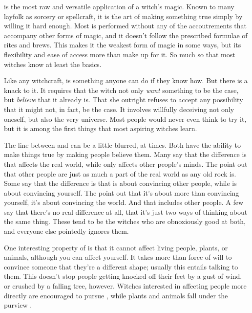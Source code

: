 
 is the most raw and versatile application of a witch's magic.
Known to many layfolk as sorcery or spellcraft, it is the art of making something true simply by willing it hard enough.
Most  is performed without any of the accoutrements that accompany other forms of magic, and it doesn't follow the prescribed formulae of rites and brews.
This makes it the weakest form of magic in some ways, but its flexibility and ease of access more than make up for it.
So much so that most witches know at least the basics.

Like any witchcraft,  is something anyone can do if they know how.
But there is a knack to it.
It requires that the witch not only \emph{want} something to be the case, but \emph{believe} that it already is.
That she outright refuses to accept any possibility that it might not, in fact, be the case.
It involves willfully deceiving not only oneself, but also the very universe.
Most people would never even think to try it, but it is among the first things that most aspiring witches learn.

The line between  and  can be a little blurred, at times.
Both have the ability to make things true by making people believe them.
Many  say that the difference is that  affects the real world, while  only affects other people's minds.
The  point out that other people are just as much a part of the real world as any old rock is.
Some  say that the difference is that  is about convincing other people, while  is about convincing yourself.
The  point out that it's about more than convincing yourself, it's about convincing the world.
And that includes other people.
A few say that there's no real difference at all, that it's just two ways of thinking about the same thing.
These tend to be the witches who are obnoxiously good at both, and everyone else pointedly ignores them.

One interesting property of  is that it cannot affect living people, plants, or animals, although you can affect yourself.
It takes more than force of will to convince someone that they're a different shape; usually this entails talking to them.
This doesn't stop people getting knocked off their feet by a gust of wind, or crushed by a falling tree, however.
Witches interested in affecting people more directly are encouraged to pursue , while plants and animals fall under the purview .

